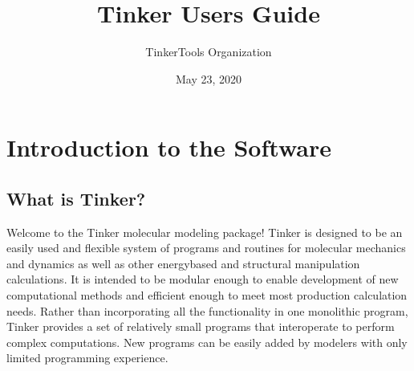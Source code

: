 \documentclass[letterpaper,11pt,english]{sphinxmanual}
\title{Tinker User\textquotesingle{}s Guide}
\date{May 23, 2020}
\author{TinkerTools Organization}
\begin{document}
\pagestyle{empty}
\sphinxmaketitle
\pagestyle{plain}
\sphinxtableofcontents
\pagestyle{normal}
\label{\detokenize{index::doc}}



\chapter{Introduction to the Software}
\label{\detokenize{text/introduction:introduction-to-the-software}}\label{\detokenize{text/introduction::doc}}

\section{What is Tinker?}
\label{\detokenize{text/introduction:what-is-tinker}}
Welcome to the Tinker molecular modeling package! Tinker is designed to be an easily used and flexible system of programs and routines for molecular mechanics and dynamics as well as other energy\sphinxhyphen{}based and structural manipulation calculations. It is intended to be modular enough to enable development of new computational methods and efficient enough to meet most production calculation needs. Rather than incorporating all the functionality in one monolithic program, Tinker provides a set of relatively small programs that interoperate to perform complex computations. New programs can be easily added by modelers with only limited programming experience.
\end{document}

